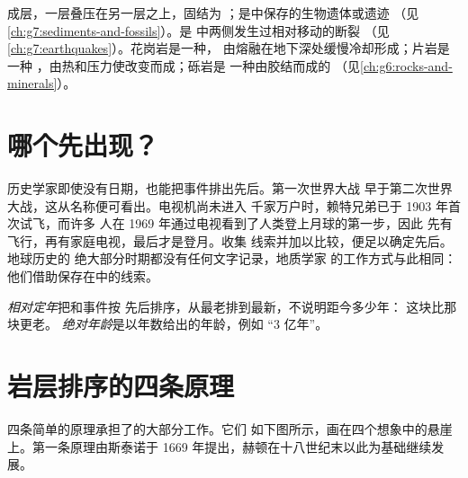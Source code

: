 \begin{recall}
成层，一层叠压在另一层之上，固结为
；是中保存的生物遗体或遗迹
（见\cref{ch:g7:sediments-and-fossils}）。\emph{}是
中两侧发生过相对移动的断裂
（见\cref{ch:g7:earthquakes}）。花岗岩是一种\emph{}，
由熔融在地下深处缓慢冷却形成；片岩是一种
\emph{}，由热和压力使改变而成；砾岩是
一种由胶结而成的
（见\cref{ch:g6:rocks-and-minerals}）。
\end{recall}

\section{哪个先出现？}

历史学家即使没有日期，也能把事件排出先后。第一次世界大战
早于第二次世界大战，这从名称便可看出。电视机尚未进入
千家万户时，赖特兄弟已于 1903 年首次试飞，而许多
人在 1969 年通过电视看到了人类登上月球的第一步，因此
先有飞行，再有家庭电视，最后才是登月。收集
线索并加以比较，便足以确定先后。地球历史的
绝大部分时期都没有任何文字记录，地质学家
的工作方式与此相同：他们借助保存在中的线索。

\begin{definition}[相对定年与绝对年龄]\label{def:g7:geological-time:relative-dating}
\emph{相对定年}把和事件按
先后排序，从最老排到最新，不说明距今多少年：
这块比那块更老。
\emph{绝对年龄}是以年数给出的年龄，例如
“3 亿年”。
\end{definition}

\section{岩层排序的四条原理}

四条简单的原理承担了的大部分工作。它们
如下图所示，画在四个想象中的悬崖上。第一条原理由斯泰诺于 1669 年提出，赫顿在十八世纪末以此为基础继续发展。

